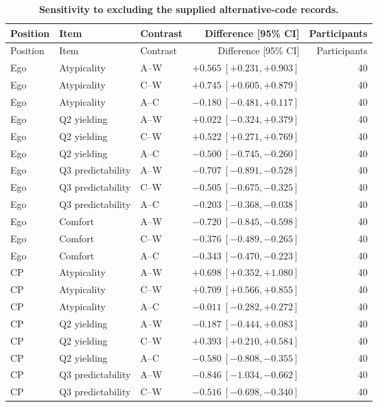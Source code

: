 \begingroup\scriptsize
\setlength{\tabcolsep}{4pt}
\renewcommand{\arraystretch}{1.1}
\begin{longtable}{lllrr}
\caption{\textbf{Sensitivity to excluding the supplied alternative-code records.}}\label{tab:subjective_alt}\\
\toprule
Position & Item & Contrast & Difference [95\% CI] & Participants \\
\midrule
\endfirsthead
\toprule
Position & Item & Contrast & Difference [95\% CI] & Participants \\
\midrule
\endhead
\bottomrule
\endfoot
Ego & Atypicality & A--W & $+0.565\ [+0.231,+0.903]$ & 40 \\
Ego & Atypicality & C--W & $+0.745\ [+0.605,+0.879]$ & 40 \\
Ego & Atypicality & A--C & $-0.180\ [-0.481,+0.117]$ & 40 \\
Ego & Q2 yielding & A--W & $+0.022\ [-0.324,+0.379]$ & 40 \\
Ego & Q2 yielding & C--W & $+0.522\ [+0.271,+0.769]$ & 40 \\
Ego & Q2 yielding & A--C & $-0.500\ [-0.745,-0.260]$ & 40 \\
Ego & Q3 predictability & A--W & $-0.707\ [-0.891,-0.528]$ & 40 \\
Ego & Q3 predictability & C--W & $-0.505\ [-0.675,-0.325]$ & 40 \\
Ego & Q3 predictability & A--C & $-0.203\ [-0.368,-0.038]$ & 40 \\
Ego & Comfort & A--W & $-0.720\ [-0.845,-0.598]$ & 40 \\
Ego & Comfort & C--W & $-0.376\ [-0.489,-0.265]$ & 40 \\
Ego & Comfort & A--C & $-0.343\ [-0.470,-0.223]$ & 40 \\
CP & Atypicality & A--W & $+0.698\ [+0.352,+1.080]$ & 40 \\
CP & Atypicality & C--W & $+0.709\ [+0.566,+0.855]$ & 40 \\
CP & Atypicality & A--C & $-0.011\ [-0.282,+0.272]$ & 40 \\
CP & Q2 yielding & A--W & $-0.187\ [-0.444,+0.083]$ & 40 \\
CP & Q2 yielding & C--W & $+0.393\ [+0.210,+0.584]$ & 40 \\
CP & Q2 yielding & A--C & $-0.580\ [-0.808,-0.355]$ & 40 \\
CP & Q3 predictability & A--W & $-0.846\ [-1.034,-0.662]$ & 40 \\
CP & Q3 predictability & C--W & $-0.516\ [-0.698,-0.340]$ & 40 \\

\end{longtable}

